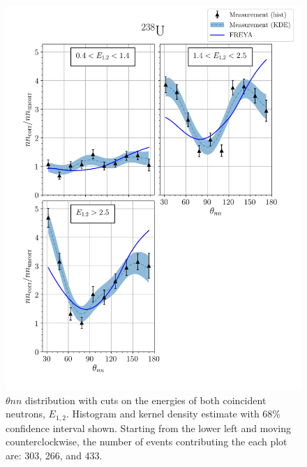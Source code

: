 \begin{figure}
\centering
    \includegraphics[width = 1.1\textwidth]{Content/Results/FinalDUResultw_freya2KDE.png}
    \caption{ $\theta{nn}$ distribution with cuts on the energies of both coincident neutrons, $E_{1,2}$.
    Histogram and kernel density estimate with 68\% confidence interval shown.
    Starting from the lower left and moving counterclockwise, the number of events contributing the each plot are: 303, 266, and 433.}
    \label{fig:DU(2)}
\end{figure}

